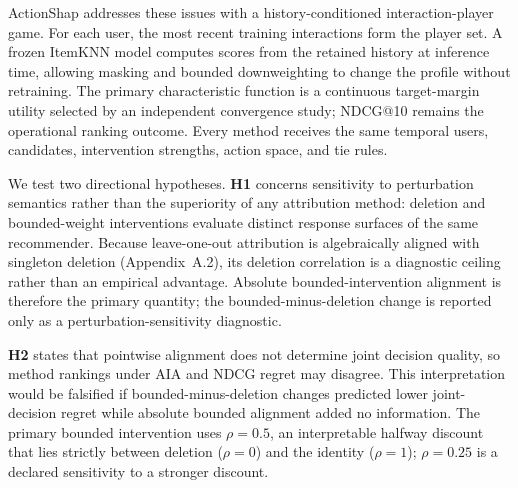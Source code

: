 \documentclass[manuscript,screen,review,anonymous]{acmart}
\begin{document}
ActionShap addresses these issues with a history-conditioned interaction-player game. For each user, the most recent training interactions form the player set. A frozen ItemKNN model computes scores from the retained history at inference time, allowing masking and bounded downweighting to change the profile without retraining. The primary characteristic function is a continuous target-margin utility selected by an independent convergence study; NDCG@10 remains the operational ranking outcome. Every method receives the same temporal users, candidates, intervention strengths, action space, and tie rules.

We test two directional hypotheses. \textbf{H1} concerns sensitivity to perturbation semantics rather than the superiority of any attribution method: deletion and bounded-weight interventions evaluate distinct response surfaces of the same recommender. Because leave-one-out attribution is algebraically aligned with singleton deletion (Appendix~A.2), its deletion correlation is a diagnostic ceiling rather than an empirical advantage. Absolute bounded-intervention alignment is therefore the primary quantity; the bounded-minus-deletion change is reported only as a perturbation-sensitivity diagnostic.

\textbf{H2} states that pointwise alignment does not determine joint decision quality, so method rankings under AIA and NDCG regret may disagree. This interpretation would be falsified if bounded-minus-deletion changes predicted lower joint-decision regret while absolute bounded alignment added no information. The primary bounded intervention uses $\rho=0.5$, an interpretable halfway discount that lies strictly between deletion ($\rho=0$) and the identity ($\rho=1$); $\rho=0.25$ is a declared sensitivity to a stronger discount.
\end{document}
